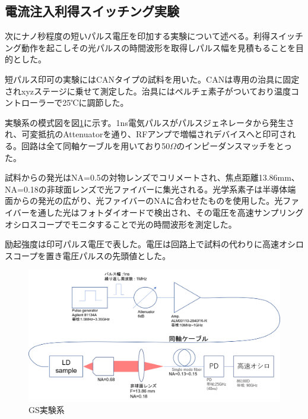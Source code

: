 \subsection{電流注入利得スイッチング実験}%
次にナノ秒程度の短いパルス電圧を印加する実験について述べる。利得スイッチング動作を起こしその光パルスの時間波形を取得しパルス幅を見積もることを目的とした。

短パルス印可の実験にはCANタイプの試料を用いた。CANは専用の治具に固定されxyzステージに乗せて測定した。治具にはペルチェ素子がついており温度コントローラーで25℃に調節した。


実験系の模式図を図\ref{fig:fig_2_3_GS_setup}に示す。1ns電気パルスがパルスジェネレータから発生され、可変抵抗のAttenuatorを通り、RFアンプで増幅されデバイスへと印可される。回路は全て同軸ケーブルを用いており50$\Omega$のインピーダンスマッチをとった。

試料からの発光はNA=0.5の対物レンズでコリメートされ、焦点距離13.86mm、NA=0.18の非球面レンズで光ファイバーに集光される。光学系素子は半導体端面からの発光の広がり、光ファイバーのNAに合わせたものを使用した。光ファイバーを通した光はフォトダイオードで検出され、その電圧を高速サンプリングオシロスコープでモニタすることで光の時間波形を測定した。

励起強度は印可パルス電圧で表した。電圧は回路上で試料の代わりに高速オシロスコープを置き電圧パルスの先頭値とした。
\begin{figure}[h]
	\includegraphics[width=15cm]{figure/fig_2_3_GS_setup.png}
	\caption{GS実験系}
	\label{fig:fig_2_3_GS_setup}
\end{figure}


